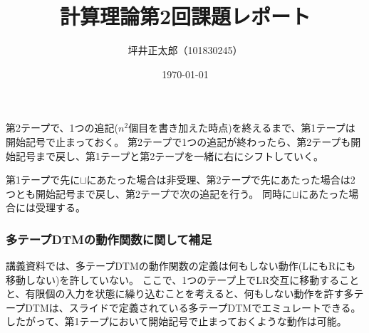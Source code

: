 \documentclass[a4paper,10pt]{jsarticle}
\begin{document}
\title{計算理論第2回課題レポート}
\author{坪井正太郎（101830245）}
\date{\today}
\maketitle
第2テープで、1つの追記($n^2$個目を書き加えた時点)を終えるまで、第1テープは開始記号で止まっておく。
第2テープで1つの追記が終わったら、第2テープも開始記号まで戻し、第1テープと第2テープを一緒に右にシフトしていく。

第1テープで先に$\sqcup$にあたった場合は非受理、第2テープで先にあたった場合は2つとも開始記号まで戻し、第2テープで次の追記を行う。
同時に$\sqcup$にあたった場合には受理する。
\\

\subsubsection*{多テープDTMの動作関数に関して補足}
講義資料では、多テープDTMの動作関数の定義は何もしない動作(LにもRにも移動しない)を許していない。
ここで、1つのテープ上でLR交互に移動することと、有限個の入力を状態に繰り込むことを考えると、何もしない動作を許す多テープDTMは、スライドで定義されている多テープDTMでエミュレートできる。
したがって、第1テープにおいて開始記号で止まっておくような動作は可能。
\end{document}
